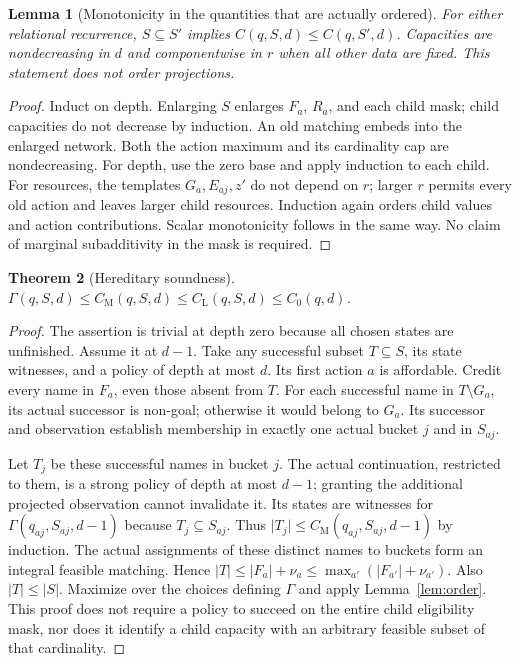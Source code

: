 \documentclass[11pt]{article}
\newtheorem{theorem}{Theorem}[section]
\newtheorem{lemma}[theorem]{Lemma}
\theoremstyle{definition}
\newcommand{\card}[1]{\lvert #1\rvert}
\newcommand{\CL}{C_{\mathrm L}}
\newcommand{\CM}{C_{\mathrm M}}
\begin{document}
\begin{lemma}[Monotonicity in the quantities that are actually ordered]
For either relational recurrence, $S\subseteq S'$ implies
$C(q,S,d)\leq C(q,S',d)$. Capacities are nondecreasing in $d$ and componentwise
in $r$ when all other data are fixed. This statement does not order projections.
\end{lemma}
\begin{proof}
Induct on depth. Enlarging $S$ enlarges $F_a$, $R_a$, and each child mask;
child capacities do not decrease by induction. An old matching embeds into
the enlarged network. Both the action maximum and its cardinality cap are
nondecreasing. For depth, use the zero base and apply induction to each child.
For resources, the templates $G_a,E_{aj},z'$ do not depend on $r$; larger $r$
permits every old action and leaves larger child resources. Induction again
orders child values and action contributions. Scalar monotonicity follows in
the same way. No claim of marginal subadditivity in the mask is required.
\end{proof}

\begin{theorem}[Hereditary soundness]\label{thm:sound}
$\Gamma(q,S,d)\leq\CM(q,S,d)\leq\CL(q,S,d)\leq C_0(q,d)$.
\end{theorem}
\begin{proof}
The assertion is trivial at depth zero because all chosen states are unfinished.
Assume it at $d-1$. Take any successful subset $T\subseteq S$, its state
witnesses, and a policy of depth at most $d$. Its first action $a$ is affordable.
Credit every name in $F_a$, even those absent from $T$. For each successful
name in $T\setminus G_a$, its actual successor is non-goal; otherwise it would
belong to $G_a$. Its successor and observation establish membership in exactly
one actual bucket $j$ and in $S_{aj}$.

Let $T_j$ be these successful names in bucket $j$. The actual continuation,
restricted to them, is a strong policy of depth at most $d-1$; granting the
additional projected observation cannot invalidate it. Its states are witnesses
for $\Gamma(q_{aj},S_{aj},d-1)$ because $T_j\subseteq S_{aj}$.
Thus $\card{T_j}\leq\CM(q_{aj},S_{aj},d-1)$ by induction. The actual assignments
of these distinct names to buckets form an integral feasible matching. Hence
$\card T\leq\card{F_a}+\nu_a\leq\max_{a'}(\card{F_{a'}}+\nu_{a'})$.
Also $\card T\leq\card S$. Maximize over the choices defining $\Gamma$ and
apply Lemma~\ref{lem:order}. This proof does not require a policy to succeed on
the entire child eligibility mask, nor does it identify a child capacity with
an arbitrary feasible subset of that cardinality.
\end{proof}
\end{document}
